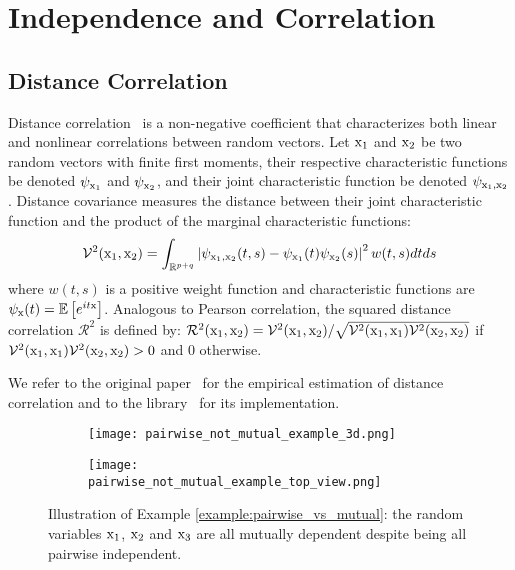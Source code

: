 \section{Independence and Correlation} 

\subsection{Distance Correlation} \label{subapp:dcorr_details}

Distance correlation~\citep{szekely2007_dcorr} is a non-negative coefficient that characterizes both linear and nonlinear correlations between random vectors. %
Let ${\textnormal{x}}_1$ and ${\textnormal{x}}_2$ be two random vectors with finite first moments, their respective characteristic functions be denoted $\psi_{{\textnormal{x}}_1}$ and $\psi_{{\textnormal{x}}_2}$, and their joint characteristic function be denoted $\psi_{{\textnormal{x}}_1,{\textnormal{x}}_2}$. Distance covariance measures the distance between their joint characteristic function and the product of the marginal characteristic functions:
\begin{equation}
    \mathcal{V}^2({\textnormal{x}}_1, {\textnormal{x}}_2)=\int_{\mathbb{R}^{p+q}}\left|\psi_{{\textnormal{x}}_1, {\textnormal{x}}_2}(t, s)-\psi_{{\textnormal{x}}_1}(t) \psi_{{\textnormal{x}}_2}(s)\right|^2 w(t, s) d t d s
\end{equation}
where $w(t, s)$ is a positive weight function and characteristic functions are $\psi_{{\textnormal{x}}}(t)=\mathbb{E}\left[e^{i t {\textnormal{x}}}\right]$. Analogous to Pearson correlation, the squared distance correlation $\mathcal{R}^2$ is defined by: $\mathcal{R}^2({\textnormal{x}}_1,{\textnormal{x}}_2) = \mathcal{V}^2({\textnormal{x}}_1,{\textnormal{x}}_2) / \sqrt{\mathcal{V}^2({\textnormal{x}}_1, {\textnormal{x}}_1) \mathcal{V}^2({\textnormal{x}}_2, {\textnormal{x}}_2)}$ if $\mathcal{V}^2({\textnormal{x}}_1, {\textnormal{x}}_1) \mathcal{V}^2({\textnormal{x}}_2, {\textnormal{x}}_2)>0$ and $0$ otherwise. 

We refer to the original paper~\citep{szekely2007_dcorr} for the empirical estimation of distance correlation and to the library~\citep{carreno2023_dcor_python} for its implementation. 

\begin{figure}
    \centering
    \begin{subfigure}{0.49\textwidth}
        \centering
        \texttt{[image: pairwise\_not\_mutual\_example\_3d.png]}
    \end{subfigure}
    \hfill
    \begin{subfigure}{0.49\textwidth}
        \centering
        \texttt{[image: pairwise\_not\_mutual\_example\_top\_view.png]}
    \end{subfigure}
    \caption{Illustration of Example \ref{example:pairwise_vs_mutual}: the random variables ${\textnormal{x}}_1$, ${\textnormal{x}}_2$ and ${\textnormal{x}}_3$ are all mutually dependent despite being all pairwise independent.}
    \label{fig:pairwise_not_mutual_illustrs}
\end{figure}

